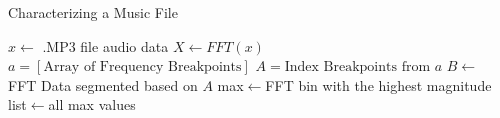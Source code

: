 \documentclass[conference]{IEEEtran}
\begin{document}
\begin{algorithm}
  \caption{Characterizing a Music File}\label{alg:characterize}
  \begin{algorithmic}
    \State $x\gets$ .MP3 file audio data
    \State $X\gets FFT(x)$
    \State $a=[\text{Array of Frequency Breakpoints}]$
    \State $A=\text{Index Breakpoints from }a$
    \State $B\gets$ FFT Data segmented based on $A$
    \State max$\gets$FFT bin with the highest magnitude
    \EndFor
    \State list$\gets$all max values 
    \State {}
    \EndFunction
  \end{algorithmic}
\end{algorithm}
\end{document}
